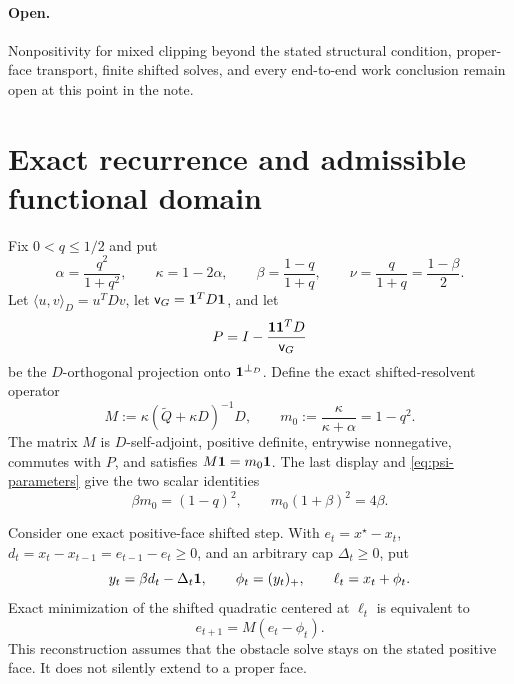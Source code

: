 \documentclass[11pt]{article}
\begin{document}
\paragraph{Open.}
Nonpositivity for mixed clipping beyond the stated structural condition,
proper-face transport, finite shifted solves, and every end-to-end work
conclusion remain open at this point in the note.

\section{Exact recurrence and admissible functional domain}

Fix $0<q\leq1/2$ and put
\begin{equation}
 \alpha=\frac{q^2}{1+q^2},\qquad
 \kappa=1-2\alpha,\qquad
 \beta=\frac{1-q}{1+q},\qquad
 \nu=\frac{q}{1+q}=\frac{1-\beta}{2}.
 \label{eq:psi-parameters}
\end{equation}
Let $\langle u,v\rangle_D=u^TDv$, let
$\mathsf v_G=\mathbf{1}^TD\mathbf{1}$, and let
\begin{equation}
 P=I-\frac{\mathbf{1}\mathbf{1}^TD}{\mathsf v_G}
 \label{eq:psi-projection}
\end{equation}
be the $D$-orthogonal projection onto $\mathbf{1}^{\perp_D}$.  Define the exact
shifted-resolvent operator
\begin{equation}
 M:=\kappa(\widetilde Q+\kappa D)^{-1}D,
 \qquad
 m_0:=\frac{\kappa}{\kappa+\alpha}=1-q^2.
 \label{eq:psi-resolvent}
\end{equation}
The matrix $M$ is $D$-self-adjoint, positive definite, entrywise
nonnegative, commutes with $P$, and satisfies $M\mathbf{1}=m_0\mathbf{1}$.  The last
display and \cref{eq:psi-parameters} give the two scalar identities
\begin{equation}
 \beta m_0=(1-q)^2,
 \qquad
 m_0(1+\beta)^2=4\beta.
 \label{eq:psi-scalar-identities}
\end{equation}

Consider one exact positive-face shifted step.  With
$e_t=x^\star-x_t$, $d_t=x_t-x_{t-1}=e_{t-1}-e_t\geq0$, and an arbitrary
cap $\Delta_t\geq0$, put
\begin{equation}
 y_t=\beta d_t-\Delta_t\mathbf{1},
 \qquad
 \phi_t=(y_t)_+,
 \qquad
 \ell_t=x_t+\phi_t.
 \label{eq:psi-clip}
\end{equation}
Exact minimization of the shifted quadratic centered at $\ell_t$ is
equivalent to
\begin{equation}
 e_{t+1}=M(e_t-\phi_t).
 \label{eq:psi-error-recurrence}
\end{equation}
This reconstruction assumes that the obstacle solve stays on the stated
positive face.  It does not silently extend to a proper face.
\end{document}
